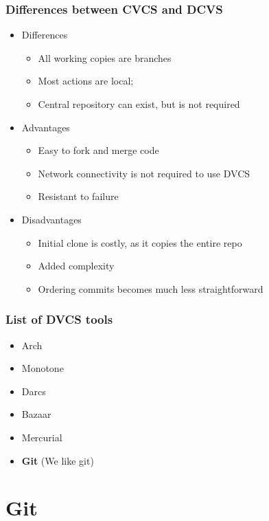 \documentclass{beamer}
\begin{document}
\begin{frame}
  \frametitle{Differences between CVCS and DCVS}
  \begin{itemize}
    \item Differences
      \begin{itemize}
	\item All working copies are branches
	\item Most actions are local;
	\item Central repository can exist, but is not required
      \end{itemize}
    \item Advantages
      \begin{itemize}
	\item Easy to fork and merge code
	\item Network connectivity is not required to use DVCS
	\item Resistant to failure
      \end{itemize}
    \item Disadvantages
      \begin{itemize}
	\item Initial clone is costly, as it copies the entire repo
	\item Added complexity 
        \item Ordering commits becomes much less straightforward
      \end{itemize}
  \end{itemize}
\end{frame}

\begin{frame}
  \frametitle{List of DVCS tools}
  \begin{itemize}
    \item Arch
    \item Monotone
    \item Darcs
    \item Bazaar
    \item Mercurial
    \item {\bf Git} (We like git)
  \end{itemize}
\end{frame}

\section{Git}
\end{document}
